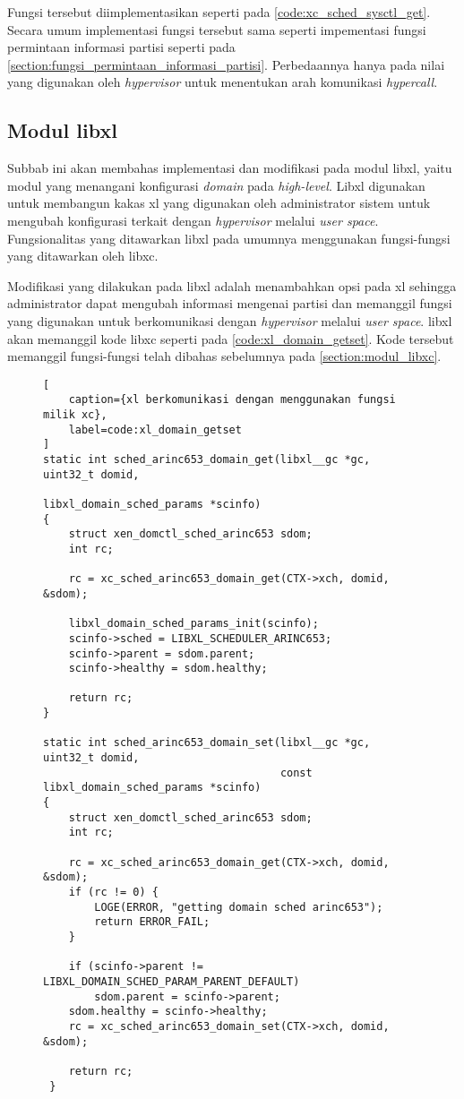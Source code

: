 Fungsi tersebut diimplementasikan seperti pada \autoref{code:xc_sched_sysctl_get}. Secara umum
implementasi fungsi tersebut sama seperti impementasi fungsi permintaan informasi partisi
seperti pada \autoref{section:fungsi_permintaan_informasi_partisi}. Perbedaannya hanya pada
nilai yang digunakan oleh \textit{hypervisor} untuk menentukan arah komunikasi
\textit{hypercall}.

\subsection{Modul libxl}
\label{section:modul_libxl}

Subbab ini akan membahas implementasi dan modifikasi pada modul libxl, yaitu modul yang
menangani konfigurasi \textit{domain} pada \textit{high-level}. Libxl digunakan untuk membangun
kakas xl yang digunakan oleh administrator sistem untuk mengubah konfigurasi terkait dengan
\textit{hypervisor} melalui \textit{user space}. Fungsionalitas yang ditawarkan libxl pada
umumnya menggunakan fungsi-fungsi yang ditawarkan oleh libxc.

Modifikasi yang dilakukan pada libxl adalah menambahkan opsi pada xl sehingga administrator
dapat mengubah informasi mengenai partisi dan memanggil fungsi yang digunakan untuk
berkomunikasi dengan \textit{hypervisor} melalui \textit{user space}. libxl akan memanggil kode
libxc seperti pada \autoref{code:xl_domain_getset}. Kode tersebut memanggil fungsi-fungsi telah
dibahas sebelumnya pada \autoref{section:modul_libxc}.

\begin{figure}[!ht]
\begin{lstlisting}[
	caption={xl berkomunikasi dengan menggunakan fungsi milik xc},
	label=code:xl_domain_getset
]
static int sched_arinc653_domain_get(libxl__gc *gc, uint32_t domid,
                                   libxl_domain_sched_params *scinfo)
{
    struct xen_domctl_sched_arinc653 sdom;
    int rc;

    rc = xc_sched_arinc653_domain_get(CTX->xch, domid, &sdom);

    libxl_domain_sched_params_init(scinfo);
    scinfo->sched = LIBXL_SCHEDULER_ARINC653;
    scinfo->parent = sdom.parent;
    scinfo->healthy = sdom.healthy;

    return rc;
}

static int sched_arinc653_domain_set(libxl__gc *gc, uint32_t domid,
                                     const libxl_domain_sched_params *scinfo)
{
    struct xen_domctl_sched_arinc653 sdom;
    int rc;

    rc = xc_sched_arinc653_domain_get(CTX->xch, domid, &sdom);
    if (rc != 0) {
        LOGE(ERROR, "getting domain sched arinc653");
        return ERROR_FAIL;
    }

    if (scinfo->parent != LIBXL_DOMAIN_SCHED_PARAM_PARENT_DEFAULT)
        sdom.parent = scinfo->parent;
    sdom.healthy = scinfo->healthy;
    rc = xc_sched_arinc653_domain_set(CTX->xch, domid, &sdom);

    return rc;
 }
\end{lstlisting}
\end{figure}

